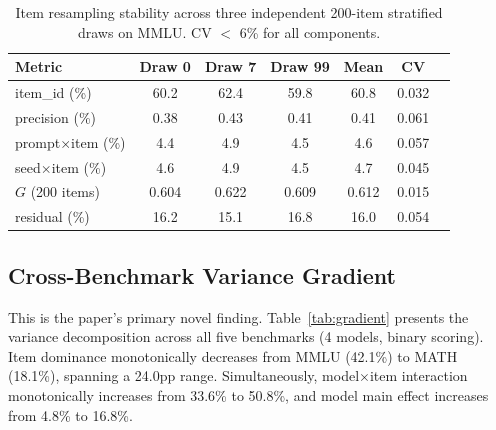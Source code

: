 \documentclass[11pt,a4paper]{article}
\newcommand{\Gcoeff}{\ensuremath{G}}
\begin{document}
\begin{table}[t]
\centering
\caption{Item resampling stability across three independent 200-item stratified draws on MMLU. CV $<$ 6\% for all components.}
\label{tab:resampling}
\small
\begin{tabular}{lcccccc}
\toprule
\textbf{Metric} & \textbf{Draw 0} & \textbf{Draw 7} & \textbf{Draw 99} & \textbf{Mean} & \textbf{CV} \\
\midrule
item\_id (\%)      & 60.2 & 62.4 & 59.8 & 60.8 & 0.032 \\
precision (\%)     &  0.38 & 0.43 & 0.41 & 0.41 & 0.061 \\
prompt$\times$item (\%) & 4.4 & 4.9 & 4.5 & 4.6 & 0.057 \\
seed$\times$item (\%)   & 4.6 & 4.9 & 4.5 & 4.7 & 0.045 \\
$\Gcoeff$ (200 items)   & 0.604 & 0.622 & 0.609 & 0.612 & 0.015 \\
residual (\%)      & 16.2 & 15.1 & 16.8 & 16.0 & 0.054 \\
\bottomrule
\end{tabular}
\end{table}

\subsection{Cross-Benchmark Variance Gradient}
\label{sec:gradient}

This is the paper's primary novel finding.
Table~\ref{tab:gradient} presents the variance decomposition across all five benchmarks (4 models, binary scoring).
Item dominance monotonically decreases from MMLU (42.1\%) to MATH (18.1\%), spanning a 24.0pp range.
Simultaneously, model$\times$item interaction monotonically increases from 33.6\% to 50.8\%, and model main effect increases from 4.8\% to 16.8\%.
\end{document}

